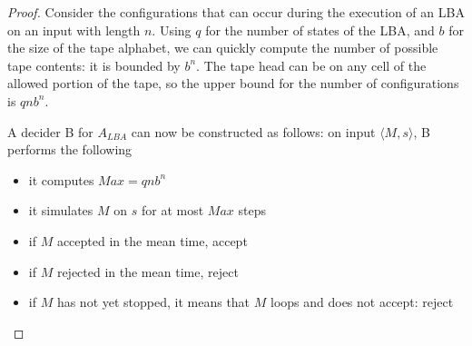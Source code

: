 \begin{proof}
Consider the configurations that can occur during the execution of
an LBA on an input with length $n$. Using $q$ for the number of states
of the LBA, and $b$ for the size of the tape alphabet, we can quickly
compute the number of possible tape contents: it is bounded by
$b^n$. The tape head can be on any cell of the allowed portion of the
tape, so the upper bound for the number of configurations is $qnb^n$.

A decider B for $A_{LBA}$ can now be constructed as follows:
on input $\langle M,s \rangle$, B performs the following
\begin{itemize}
\item it computes $Max = qnb^n$
\item it simulates $M$ on $s$ for at most $Max$ steps
\item if $M$ accepted in the mean time, accept
\item if $M$ rejected in the mean time, reject
\item if $M$ has not yet stopped, it means that $M$ loops and does not
  accept: reject
\end{itemize}
\end{proof} 

